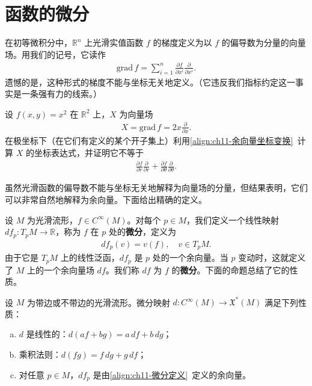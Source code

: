 \documentclass[../../main.tex]{subfiles}
\begin{document}
\section{函数的微分}\label{section:ch11-函数的微分}

在初等微积分中，$\mathbb{R}^n$ 上光滑实值函数 $f$ 的梯度定义为以 $f$ 的偏导数为分量的向量场。用我们的记号，它读作
\begin{align}
\mathrm{grad}\,f=\sum_{i=1}^n\frac{\partial f}{\partial x^i}\frac{\partial}{\partial x^i}.\label{align:ch11-梯度}
\end{align}
遗憾的是，这种形式的梯度不能与坐标无关地定义。（它违反我们指标约定这一事实是一条强有力的线索。）

\begin{exercise}\label{exercise:ch11-17}
设 $f(x,y)=x^2$ 在 $\mathbb{R}^2$ 上，$X$ 为向量场
\begin{align*}
X=\mathrm{grad}\,f=2x\frac{\partial}{\partial x}.
\end{align*}
在极坐标下（在它们有定义的某个开子集上）利用\eqref{align:ch11-余向量坐标变换}~计算 $X$ 的坐标表达式，并证明它不等于
\begin{align*}
\frac{\partial f}{\partial r}\frac{\partial}{\partial r}+\frac{\partial f}{\partial\theta}\frac{\partial}{\partial\theta}.
\end{align*}
\end{exercise}

虽然光滑函数的偏导数不能与坐标无关地解释为向量场的分量，但结果表明，它们可以非常自然地解释为余向量。下面给出精确的定义。

设 $M$ 为光滑流形，$f\in C^\infty(M)$。对每个 $p\in M$，我们定义一个线性映射 $df_p\colon T_pM\to\mathbb{R}$，称为 $f$ 在 $p$ 处的\textbf{微分}，定义为
\begin{align}
df_p(v)=v(f),\quad v\in T_pM.\label{align:ch11-微分定义}
\end{align}
由于它是 $T_pM$ 上的线性泛函，$df_p$ 是 $p$ 处的一个余向量。当 $p$ 变动时，这就定义了 $M$ 上的一个余向量场 $df$。我们称 $df$ 为 $f$ 的\textbf{微分}。下面的命题总结了它的性质。

\begin{proposition}\label{proposition:ch11-微分性质}
设 $M$ 为带边或不带边的光滑流形。微分映射 $d\colon C^\infty(M)\to\mathfrak X^*(M)$ 满足下列性质：
\begin{enumerate}[(a)]
\item $d$ 是线性的：$d(af+bg)=a\,df+b\,dg$；
\item 乘积法则：$d(fg)=f\,dg+g\,df$；
\item 对任意 $p\in M$，$df_p$ 是由\eqref{align:ch11-微分定义}~定义的余向量。
\end{enumerate}
\end{proposition}
\end{document}
